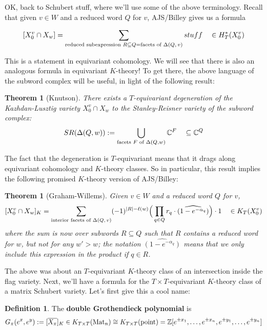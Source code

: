 \documentclass[12pt]{amsart}
\numberwithin{equation}{section}
\newtheorem{Theorem}[equation]{Theorem}
\theoremstyle{definition}
\newtheorem{Definition}[equation]{Definition}
\numberwithin{figure}{section}
\begin{document}
OK, back to Schubert stuff, where we'll use some of the above terminology. Recall that given $v\in W$ and a reduced word $Q$ for $v$, AJS/Billey gives us a formula

\[ [ X_0^v \cap X_w] = \sum_{\textup{reduced subexpression }R\subseteq Q\\ = \textup{facets of $\Delta(Q,v)$}} stuff \quad \in H_T^*(X_0^v)\]

This is a statement in equivariant cohomology. We will see that there is also an analogous formula in equivariant $K$-theory!  To get there, the above language of the subword complex will be useful, in light of the following result:

\begin{Theorem}[Knutson] There exists a $T$-equivariant degeneration of the Kazhdan-Lusztig variety $X_0^v \cap X_w$ to the Stanley-Reisner variety of the subword complex:
\[ SR(\Delta(Q,w)) := \bigcup_{\textup{facets $F$ of }\Delta(Q,w)} \mathbb{C}^F \quad \subseteq \mathbb{C}^Q\]
\end{Theorem}

The fact that the degeneration is $T$-equivariant means that it drags along equivariant cohomology and $K$-theory classes. So in particular, this result implies the following promised $K$-theory version of AJS/Billey:
\begin{Theorem}[Graham-Willems]
Given $v\in W$ and a reduced word $Q$ for $v$,
\[ [ X_0^v \cap X_w]_K = \sum_{\textup{interior facets of $\Delta(Q,v)$}} (-1)^{|R|-\ell(w)}\Big(\prod_{q\in Q}r_q\cdot  \widehat{(1-e^{-\alpha_q})}\Big)\cdot 1 \quad \in K_T(X_0^v)\]
where the sum is now over subwords $R\subseteq Q$ such that $R$ contains a reduced word for $w$, but not for any $w' > w$; the notation $\widehat{(1-e^{-\alpha_q})}$ means that we only include this expression in the product if $q\in R$. 
\end{Theorem}

The above was about an $T$-equivariant $K$-theory class of an intersection inside the flag variety. Next, we'll have a formula for the $T\times T$-equivariant $K$-theory class of a matrix Schubert variety. Let's first give this a cool name:

\begin{Definition}
The \textbf{double Grothendieck polynomial} is 
\[ G_\pi(e^x, e^y) := [ \overline{X_\pi}]_K \in K_{T\times T}(\textup{Mat}_n) \cong K_{T\times T}(\textup{point}) = \mathbb{Z}[e^{\pm x_1}, \dots, e^{\pm x_n}, e^{\pm y_1}, \dots, e^{\pm y_n}]\]
\end{Definition}
\end{document}
